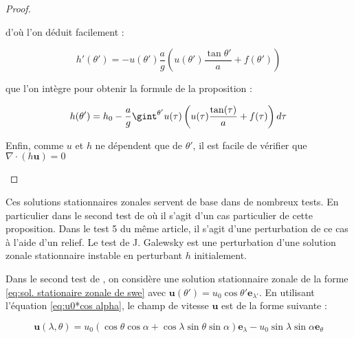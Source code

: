 \begin{proof}
\begin{itemize}
d'où l'on déduit facilement :

\begin{equation}
h'(\theta') = - u(\theta') \dfrac{a}{g} \left( u(\theta') \dfrac{\tan \theta'}{a} + f(\theta') \right)
\end{equation}

que l'on intègre pour obtenir la formule de la proposition :

\begin{equation}
h(\theta') = h_0 - \dfrac{a}{g} \gint^{\theta'} u(\tau) \left( u(\tau) \dfrac{\tan (\tau)}{a} + f(\tau) \right) d\tau
\end{equation}

Enfin, comme $u$ et $h$ ne dépendent que de $\theta'$, il est facile de vérifier que $\nabla \cdot \left( h \mathbf{u} \right)=0$
\end{itemize}
\end{proof}

Ces solutions stationnaires zonales servent de base dans de nombreux tests. En particulier dans le second test de \cite{Williamson1992} où il s'agit d'un cas particulier de cette proposition. Dans le test 5 du même article, il s'agit d'une perturbation de ce cas à l'aide d'un relief.
Le test de J. Galewsky \cite{Galewsky2004} est une perturbation d'une solution zonale stationnaire instable en perturbant $h$ initialement.





















Dans le second test de \cite{Williamson1992}, on considère une solution stationnaire zonale de la forme \eqref{eq:sol. stationaire zonale de swe} avec $\mathbf{u}(\theta')=u_0 \cos \theta' \mathbf{e}_{\lambda'}$. En utilisant l'équation \eqref{eq:u0*cos alpha}, le champ de vitesse $\mathbf{u}$ est de la forme suivante :

\begin{equation}
\mathbf{u}(\lambda, \theta) = u_0 \left( \cos \theta \cos \alpha + \cos \lambda \sin \theta \sin \alpha \right) \mathbf{e}_{\lambda} - u_0 \sin \lambda \sin \alpha \mathbf{e}_{\theta}
\label{eq: williamson 2 initial velocity}
\end{equation} 

